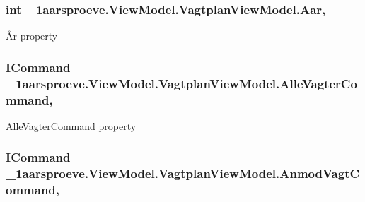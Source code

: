 \subsubsection[{Aar}]{\setlength{\rightskip}{0pt plus 5cm}int \+\_\+1aarsproeve.\+View\+Model.\+Vagtplan\+View\+Model.\+Aar\hspace{0.3cm}{\ttfamily [get]}, {\ttfamily [set]}}\label{class__1aarsproeve_1_1_view_model_1_1_vagtplan_view_model_a228aec3a762361d7f727ef3deacac91c}


År property 

\hypertarget{class__1aarsproeve_1_1_view_model_1_1_vagtplan_view_model_a9ff1365b62555d179cf34a5e11a6d5fc}{}
\subsubsection[{Alle\+Vagter\+Command}]{\setlength{\rightskip}{0pt plus 5cm}I\+Command \+\_\+1aarsproeve.\+View\+Model.\+Vagtplan\+View\+Model.\+Alle\+Vagter\+Command\hspace{0.3cm}{\ttfamily [get]}, {\ttfamily [set]}}\label{class__1aarsproeve_1_1_view_model_1_1_vagtplan_view_model_a9ff1365b62555d179cf34a5e11a6d5fc}


Alle\+Vagter\+Command property 

\hypertarget{class__1aarsproeve_1_1_view_model_1_1_vagtplan_view_model_a470dc3d93a55c5ff2f1f31f9f3ff6097}{}
\subsubsection[{Anmod\+Vagt\+Command}]{\setlength{\rightskip}{0pt plus 5cm}I\+Command \+\_\+1aarsproeve.\+View\+Model.\+Vagtplan\+View\+Model.\+Anmod\+Vagt\+Command\hspace{0.3cm}{\ttfamily [get]}, {\ttfamily [set]}}\label{class__1aarsproeve_1_1_view_model_1_1_vagtplan_view_model_a470dc3d93a55c5ff2f1f31f9f3ff6097}


